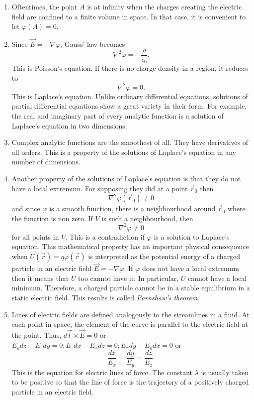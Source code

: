 \documentclass{article}
\newcommand{\grad}[1]{\nabla{#1}}
\begin{document}
\begin{enumerate}
\item Oftentimes, the point $A$ is at infinity when the charges creating the
electric field are confined to a finite volume in space. In that case, it is 
convenient to let $\varphi(A) = 0$.

\item Since $\vec{E} = -\grad\varphi$, Gauss' law becomes
\begin{equation}\label{e5}
\nabla^2\varphi = -\frac{\rho}{\epsilon_0}.
\end{equation}
This is Poisson's equation. If there is no charge density in a region, it reduces 
to
\begin{equation}\label{e6}
\nabla^2\varphi = 0.
\end{equation}
This is Laplace's equation. Unlike ordinary differential equations, solutions of
partial differential equations show a great variety in their form. For example,
the real and imaginary part of every analytic function is a solution of Laplace's
equation in two dimensions.

\item Complex analytic functions are the smoothest of all. They have derivatives of
all orders. This is a property of the solutions of Laplace's equation in any number
of dimensions.

\item Another property of the solutions of Laplace's equation is that they do not
have a local extremum. For supposing they did at a point $\vec{r}_0$ then 
\[
\nabla^2\varphi(\vec{r}_0) \ne 0
\]
and since $\varphi$ is a smooth function, there is a neighbourhood around 
$\vec{r}_0$ where the function is non zero. If $V$ is such a neighbourhood, then
\[
\nabla^2\varphi \ne 0
\]
for all points in $V$. This is a contradiction if $\varphi$ is a solution to
Laplace's equation. This mathematical property has an important physical
consequence when $U(\vec{r}) = q\varphi(\vec{r})$ is interpreted as the potential
energy of a charged particle in an electric field $\vec{E} = -\grad{\varphi}$. 
If $\varphi$ does not have a local extremum then it means that $U$ too cannot 
have it. In particular, $U$ cannot have a local minimum. Therefore, a charged
particle cannot be in a stable equilibrium in a static electric field. This
results is called \emph{Earnshaw's theorem}.

\item Lines of electric fields are defined analogously to the streamlines in a
fluid. At each point in space, the element of the curve is parallel to the
electric field at the point. Thus, $d\vec{l} \times \vec{E} = 0$ or $E_ydz - 
E_zdy = 0; E_zdx - E_xdz = 0; E_xdy - E_ydx = 0$ or
\begin{equation}\label{e7}
\frac{dx}{E_x} = \frac{dy}{E_y} = \frac{dz}{E_z}.
\end{equation}
This is the equation for electric lines of force. The constant $\lambda$ is
usually taken to be positive so that the line of force is the trajectory of
a positively charged particle in an electric field.

\end{enumerate}
\end{document}
